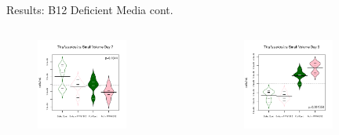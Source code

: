 \documentclass[8pt]{beamer}\usepackage[]{graphicx}\usepackage[]{color}
\begin{document}
\begin{frame}{Results: B12 Deficient Media cont.}

                                
\begin{columns}%
                        \begin{figure}
                                \includegraphics[width=0.7\textwidth]{./figure/ExpM_MiniThal_beanplot_cells_7_unlabeled}
                        \end{figure}
                        \begin{figure}
                                \includegraphics[width=0.7\textwidth]{./figure/ExpM_MiniThal_beanplot_cells_9_unlabeled}

\end{figure}
\end{columns}
\end{frame}
\end{document}
